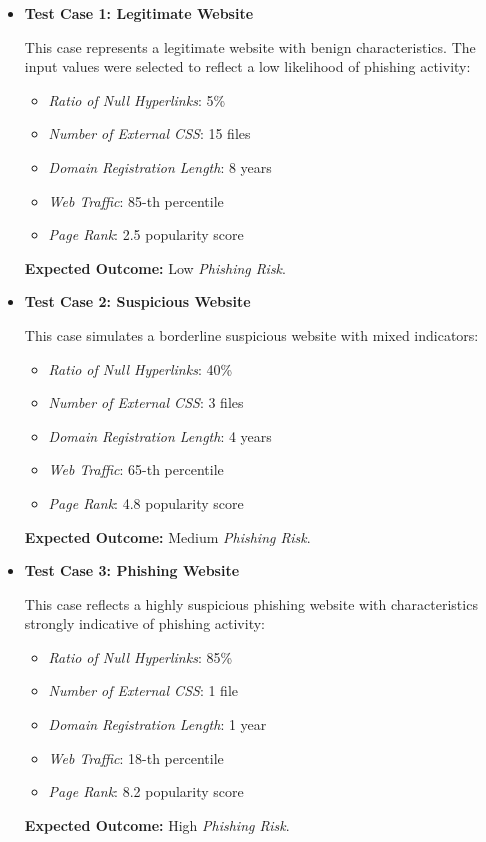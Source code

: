 \documentclass{article}
\begin{document}
\begin{itemize}
    \item \textbf{Test Case 1: Legitimate Website}
    
    This case represents a legitimate website with benign characteristics. The input values were selected to reflect a low likelihood of phishing activity:
    \begin{itemize}
        \item \textit{Ratio of Null Hyperlinks}: 5\%
        \item \textit{Number of External CSS}: 15 files
        \item \textit{Domain Registration Length}: 8 years
        \item \textit{Web Traffic}: 85-th percentile
        \item \textit{Page Rank}: 2.5 popularity score
    \end{itemize}
    \textbf{Expected Outcome:} Low \textit{Phishing Risk}.
    
    \item \textbf{Test Case 2: Suspicious Website}
    
    This case simulates a borderline suspicious website with mixed indicators:
    \begin{itemize}
        \item \textit{Ratio of Null Hyperlinks}: 40\%
        \item \textit{Number of External CSS}: 3 files
        \item \textit{Domain Registration Length}: 4 years
        \item \textit{Web Traffic}: 65-th percentile
        \item \textit{Page Rank}: 4.8 popularity score
    \end{itemize}
    \textbf{Expected Outcome:} Medium \textit{Phishing Risk}.

    \item \textbf{Test Case 3: Phishing Website}
    
    This case reflects a highly suspicious phishing website with characteristics strongly indicative of phishing activity:
    \begin{itemize}
        \item \textit{Ratio of Null Hyperlinks}: 85\%
        \item \textit{Number of External CSS}: 1 file
        \item \textit{Domain Registration Length}: 1 year
        \item \textit{Web Traffic}: 18-th percentile
        \item \textit{Page Rank}: 8.2 popularity score
    \end{itemize}
    \textbf{Expected Outcome:} High \textit{Phishing Risk}.
    

\end{itemize}
\end{document}
